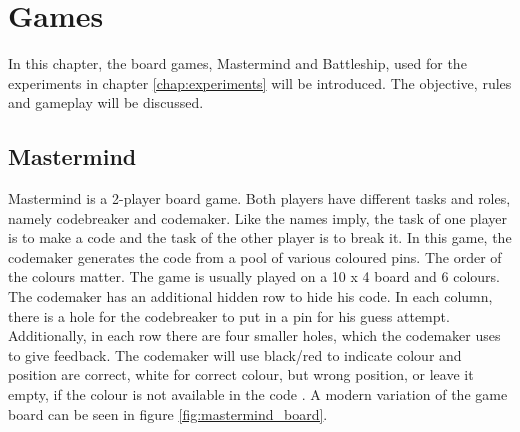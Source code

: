 \chapter{Games}
\label{chap:games}
In this chapter, the board games, Mastermind and Battleship, used for the experiments in chapter \ref{chap:experiments} will be introduced. The objective, rules and gameplay will be discussed. 

\section{Mastermind}
\label{sec:mastermind}

Mastermind is a 2-player board game. Both players have different tasks and roles, namely codebreaker and codemaker. Like the names imply, the task of one player is to make a code and the task of the other player is to break it. In this game, the codemaker generates the code from a pool of various coloured pins. The order of the colours matter. The game is usually played on a 10 x 4 board and 6 colours. The codemaker has an additional hidden row to hide his code. In each column, there is a hole for the codebreaker to put in a pin for his guess attempt. Additionally, in each row there are four smaller holes, which the codemaker uses to give feedback. The codemaker will use black/red to indicate colour and position are correct, white for correct colour, but wrong position, or leave it empty, if the colour is not available in the code \cite{Howtopla33:online}. A modern variation of the game board can be seen in figure \ref{fig:mastermind_board}.

